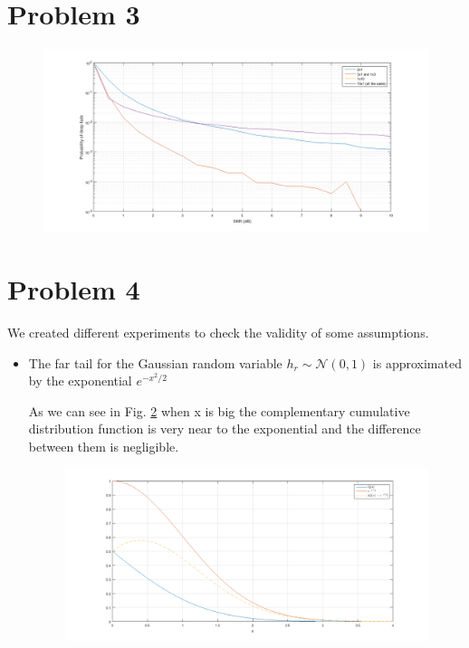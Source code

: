 \documentclass[11pt,a4paper]{article}
\begin{document}
\section{Problem 3}
\begin{figure}[h!]
\centering
\includegraphics[width=0.9\linewidth]{deepfade02}
\caption{}
\label{fig:deepfade02}
\end{figure}



\section{Problem 4}
We created different experiments to check the validity of some assumptions.

\begin{itemize}
	\item The far tail for the Gaussian random variable \(h_r \sim  \mathcal{N}(0,1) \) is approximated by the exponential \(e^{-x^2/2}\)
	
As we can see in Fig. \ref{fig:problem401} when x is big the complementary cumulative distribution function is very near to the exponential and the difference between them is negligible.
	
\begin{figure}[h!]
\centering
\includegraphics[width=0.9\linewidth]{problem401}
\caption{}
\label{fig:problem401}
\end{figure}

\end{itemize}
\end{document}
